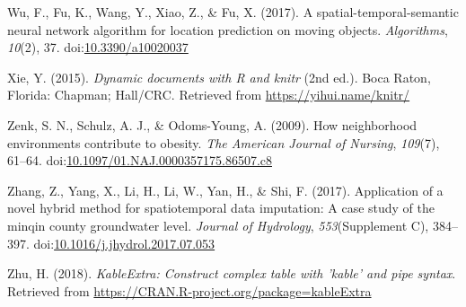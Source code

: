 \documentclass[man]{apa6}
\theoremstyle{definition}
\theoremstyle{definition}
\theoremstyle{definition}
\theoremstyle{remark}
\begin{document}
\hypertarget{ref-wu_spatial-temporal-semantic_2017}{}
Wu, F., Fu, K., Wang, Y., Xiao, Z., \& Fu, X. (2017). A
spatial-temporal-semantic neural network algorithm for location
prediction on moving objects. \emph{Algorithms}, \emph{10}(2), 37.
doi:\href{https://doi.org/10.3390/a10020037}{10.3390/a10020037}

\hypertarget{ref-R-knitr}{}
Xie, Y. (2015). \emph{Dynamic documents with R and knitr} (2nd ed.).
Boca Raton, Florida: Chapman; Hall/CRC. Retrieved from
\url{https://yihui.name/knitr/}

\hypertarget{ref-zenk_how_2009}{}
Zenk, S. N., Schulz, A. J., \& Odoms-Young, A. (2009). How neighborhood
environments contribute to obesity. \emph{The American Journal of
Nursing}, \emph{109}(7), 61--64.
doi:\href{https://doi.org/10.1097/01.NAJ.0000357175.86507.c8}{10.1097/01.NAJ.0000357175.86507.c8}

\hypertarget{ref-zhang_application_2017}{}
Zhang, Z., Yang, X., Li, H., Li, W., Yan, H., \& Shi, F. (2017).
Application of a novel hybrid method for spatiotemporal data imputation:
A case study of the minqin county groundwater level. \emph{Journal of
Hydrology}, \emph{553}(Supplement C), 384--397.
doi:\href{https://doi.org/10.1016/j.jhydrol.2017.07.053}{10.1016/j.jhydrol.2017.07.053}

\hypertarget{ref-R-kableExtra}{}
Zhu, H. (2018). \emph{KableExtra: Construct complex table with 'kable'
and pipe syntax}. Retrieved from
\url{https://CRAN.R-project.org/package=kableExtra}

\endgroup
\end{document}
